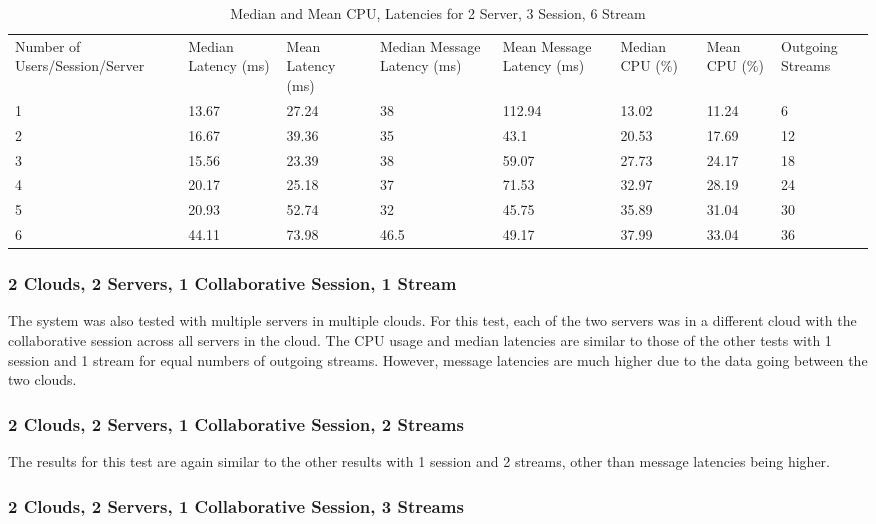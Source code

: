 \begin{table}
\caption{Median and Mean CPU, Latencies for 2 Server, 3 Session, 6 Stream}
\label{table:2serv_3sess_6str}
\begin{tabu} to\linewidth{|X[c]|X[c]|X[c]|X[c]|X[c]|X[c]|X[c]|X[c]|}
\everyrow{\hline}
\hline
Number of Users/Session/Server & Median Latency (ms) & Mean Latency (ms) & Median Message Latency (ms) & Mean Message Latency (ms) & Median CPU (\%) & Mean CPU (\%) & Outgoing Streams\\
1 & 13.67 & 27.24 & 38 & 112.94 & 13.02 & 11.24 & 6 \\
2 & 16.67 & 39.36 & 35 & 43.1 & 20.53 & 17.69 & 12 \\
3 & 15.56 & 23.39 & 38 & 59.07 & 27.73 & 24.17 & 18 \\
4 & 20.17 & 25.18 & 37 & 71.53 & 32.97 & 28.19 & 24 \\
5 & 20.93 & 52.74 & 32 & 45.75 & 35.89 & 31.04 & 30 \\
6 & 44.11 & 73.98 & 46.5 & 49.17 & 37.99 & 33.04 & 36 \\
\end{tabu}
\end{table}

\clearpage\subsubsection{2 Clouds, 2 Servers, 1 Collaborative Session, 1 Stream}

The system was also tested with multiple servers in multiple clouds. For this test, each of the two servers was in a different cloud with the collaborative session across all servers in the cloud. The CPU usage and median latencies are similar to those of the other tests with 1 session and 1 stream for equal numbers of outgoing streams. However, message latencies are much higher due to the data going between the two clouds.

\subsubsection{2 Clouds, 2 Servers, 1 Collaborative Session, 2 Streams}

The results for this test are again similar to the other results with 1 session and 2 streams, other than message latencies being higher.

\subsubsection{2 Clouds, 2 Servers, 1 Collaborative Session, 3 Streams}

